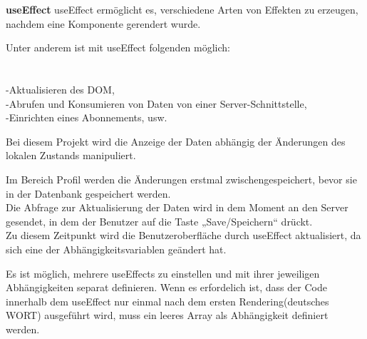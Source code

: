 \newpage

\textbf{useEffect}
useEffect ermöglicht es, verschiedene Arten von Effekten zu erzeugen, nachdem eine Komponente gerendert wurde.

Unter anderem ist mit useEffect folgenden möglich:\\\\
\\-Aktualisieren des DOM,
\\-Abrufen und Konsumieren von Daten von einer Server-Schnittstelle,
\\-Einrichten eines Abonnements, usw.
\\
\begin{flushleft}

  Bei diesem Projekt wird die Anzeige der Daten abhängig der Änderungen des lokalen Zustands manipuliert.
\end{flushleft}

Im Bereich Profil werden die Änderungen erstmal zwischengespeichert, bevor sie in der Datenbank gespeichert werden. 
\\
Die Abfrage zur Aktualisierung der Daten wird in dem Moment an den Server gesendet, in dem der Benutzer auf die Taste „Save/Speichern“ drückt.
\\
Zu diesem Zeitpunkt wird die Benutzeroberfläche durch useEffect aktualisiert, da sich eine der Abhängigkeitsvariablen geändert hat.
\\

\begin{flushleft}
  Es ist möglich, mehrere useEffects zu einstellen und mit ihrer jeweiligen Abhängigkeiten separat definieren.
  Wenn es erfordelich ist, dass der Code innerhalb dem useEffect nur einmal nach dem ersten Rendering(deutsches WORT) ausgeführt wird, muss ein leeres Array als Abhängigkeit definiert werden.
\end{flushleft}
  
